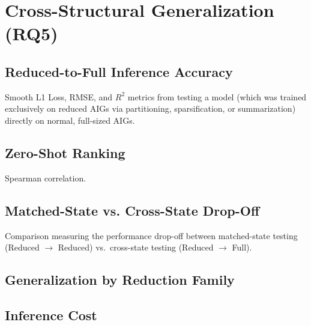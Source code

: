 \section{Cross-Structural Generalization (RQ5)}
\label{sec:results:rq5}

\subsection{Reduced-to-Full Inference Accuracy}
\label{sec:results:rq5:accuracy}
Smooth L1 Loss, RMSE, and $R^2$ metrics from testing a model (which was trained exclusively on reduced AIGs via partitioning, sparsification, or summarization) directly on normal, full-sized AIGs.


\subsection{Zero-Shot Ranking}
\label{sec:results:rq5:ranking}
Spearman correlation.

\subsection{Matched-State vs. Cross-State Drop-Off}
\label{sec:results:rq5:dropoff}
Comparison measuring the performance drop-off between matched-state testing (Reduced $\rightarrow$ Reduced) vs.\ cross-state testing (Reduced $\rightarrow$ Full).

\subsection{Generalization by Reduction Family}
\label{sec:results:rq5:byfamily}

\subsection{Inference Cost}
\label{sec:results:rq5:cost}


